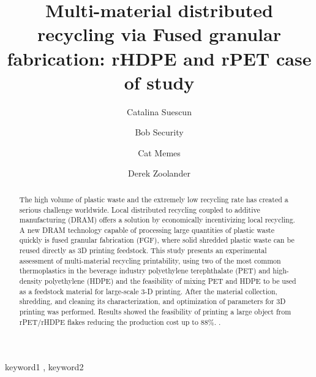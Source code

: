 \documentclass[
  12pt,
  number]{article}
\begin{document}
\begin{frontmatter}
\title{Multi-material distributed recycling via Fused granular
fabrication: rHDPE and rPET case of study}
\author[1]{Catalina Suescun%
%
}
\author[2]{Bob Security%
%
}
\author[2]{Cat Memes%
%
}
\author[]{Derek Zoolander%
%
}



        
\begin{abstract}
The high volume of plastic waste and the extremely low recycling rate
has created a serious challenge worldwide. Local distributed recycling
coupled to additive manufacturing (DRAM) offers a solution by
economically incentivizing local recycling. A new DRAM technology
capable of processing large quantities of plastic waste quickly is fused
granular fabrication (FGF), where solid shredded plastic waste can be
reused directly as 3D printing feedstock. This study presents an
experimental assessment of multi-material recycling printability, using
two of the most common thermoplastics in the beverage industry
polyethylene terephthalate (PET) and high-density polyethylene (HDPE)
and the feasibility of mixing PET and HDPE to be used as a feedstock
material for large-scale 3-D printing. After the material collection,
shredding, and cleaning its characterization, and optimization of
parameters for 3D printing was performed. Results showed the feasibility
of printing a large object from rPET/rHDPE flakes reducing the
production cost up to 88\%. .
\end{abstract}





\begin{keyword}
    keyword1 \sep 
    keyword2
\end{keyword}
\end{frontmatter}
    \ifdefined\Shaded\renewenvironment{Shaded}{\begin{tcolorbox}[enhanced, borderline west={3pt}{0pt}{shadecolor}, boxrule=0pt, frame hidden, interior hidden, breakable, sharp corners]}{\end{tcolorbox}}\fi
\end{document}
